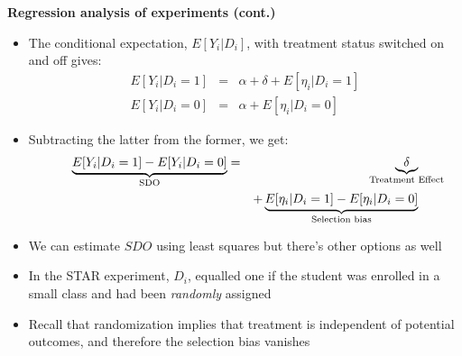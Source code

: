 \documentclass{beamer}
\begin{document}
\begin{frame}[plain]
	\begin{center}
	\textbf{Regression analysis of experiments (cont.)}
	\end{center}
	
	\begin{itemize}
	\item The conditional expectation, $E[Y_i|D_i]$, with treatment status switched on and off gives:
		\begin{eqnarray*}
		E[Y_i | D_i=1] &=& \alpha + \delta + E[\eta_i | D_i=1] \\
		E[Y_i | D_i=0] &=& \alpha + E[\eta_i | D_i=0]
		\end{eqnarray*}
	\item Subtracting the latter from the former, we get:
		\begin{eqnarray*}
		 \underbrace{E[Y_i | D_i=1]  - E[Y_i | D_i=0]}_{ \mathclap{\text{SDO}}} &=& \underbrace{\delta}_{ \mathclap{\text{Treatment Effect}}}\\
		 &&+  \underbrace{E[\eta_i | D_i=1] - E[\eta_i | D_i=0]}_{ \mathclap{\text{Selection bias}}}
		\end{eqnarray*}
	\end{itemize}
\end{frame}

\begin{frame}[plain]

\begin{itemize}
	\item We can estimate $SDO$ using least squares but there's other options as well
	\item In the STAR experiment, $D_i$, equalled one if the student was enrolled in a small class and had been \emph{randomly} assigned
	\item Recall that randomization implies that treatment is independent of potential outcomes, and therefore the selection bias vanishes
\end{itemize}
\end{frame}
\end{document}
